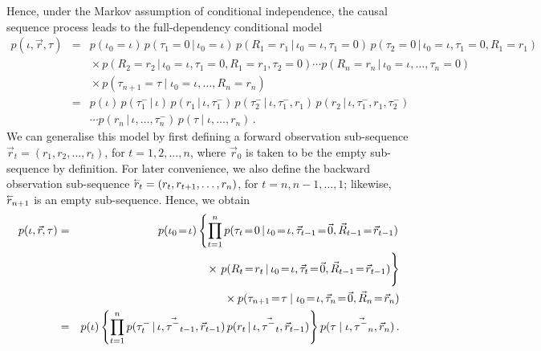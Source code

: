 \documentclass[a4paper]{article}
\newcommand{\rvec}[1]{\accentset{\leftarrow}{#1}}
\begin{document}
Hence, under the Markov assumption of conditional independence,
the causal sequence process leads to the full-dependency conditional model
\begin{eqnarray}
p({\iota},\vec{r},{\tau}) & = &
p(\iota_0\!=\!{\iota})
\,p(\tau_1\!=\!0\,|\,\iota_0\!=\!{\iota})
\,p(R_1\!=\!r_1\,|\,\iota_0\!=\!{\iota},\tau_1\!=\!0)
\,p(\tau_2\!=\!0\,|\,\iota_0\!=\!{\iota},\tau_1\!=\!0,R_1\!=\!r_1)
\nonumber\\&&
{}\times p(R_2\!=\!r_2\,|\,\iota_0\!=\!{\iota},\tau_1\!=\!0,R_1\!=\!r_1,\tau_2\!=\!0)
\cdots
p(R_n\!=\!r_n\,|\,\iota_0\!=\!{\iota},\ldots,\tau_{n}\!=\!0)
\nonumber\\&&
{}\times p(\tau_{n+1}\!=\!{\tau}\:|\;\iota_0\!=\!{\iota},\ldots,R_n\!=\!r_n)
\nonumber\\
& = &
p({\iota})
\,p(\tau^-_1\,|\,{\iota})
\,p(r_1\,|\,{\iota},\tau^-_1)
\,p(\tau^-_2\,|\,{\iota},\tau^-_1,r_1)
\, p(r_2\,|\,{\iota},\tau^-_1,r_1,\tau^-_2)
\nonumber\\
&&
\cdots
p(r_n\,|\,{\iota},\ldots,\tau^-_{n})
\, p({\tau}\:|\;{\iota},\ldots,r_n)
\,.
\label{eq:temporal-model-full}
\end{eqnarray}
We can generalise this model by first defining a forward observation sub-sequence $\vec{r}_t=(r_1,r_2,\ldots,r_t)$,
for $t=1,2,\ldots,n$, where $\vec{r}_0$ is taken to be the empty sub-sequence by definition.
 For later convenience, we also define the backward observation sub-sequence $\rvec{r}_t=(r_t,r_{t+1},\ldots,r_n)$,
for $t=n,n-1,\ldots,1$; likewise, $\rvec{r}_{n+1}$ is an empty sub-sequence.
Hence, we obtain
\begin{eqnarray}
p({\iota},\vec{r},{\tau}) & = &
p(\iota_0\!=\!{\iota})
\left\{\prod_{t=1}^{n}p(\tau_t\!=\!0\,|\,\iota_0\!=\!{\iota},\vec{\tau}_{t-1}\!=\!\vec{0},
\vec{R}_{t-1}\!=\!\vec{r}_{t-1})\right.
\nonumber\\&&
\hspace*{20mm}{}\times \left.\rule{0pt}{6mm}
p(R_t\!=\!r_t\,|\,\iota_0\!=\!{\iota},\vec{\tau}_t\!=\!\vec{0},\vec{R}_{t-1}\!=\!\vec{r}_{t-1})\right\}
\nonumber\\&&
{}\times p(\tau_{n+1}\!=\!{\tau}\:|\;\iota_0\!=\!{\iota},\vec{\tau}_n\!=\!\vec{0},\vec{R}_n\!=\!\vec{r}_n)
\nonumber\\
& = &
p({\iota})
\left\{\prod_{t=1}^{n}p(\tau^-_t\,|\,{\iota},\vec{\tau^-}_{t-1},\vec{r}_{t-1})
\,p(r_t\,|\,{\iota},\vec{\tau^-}_t,\vec{r}_{t-1})\right\}
 p({\tau}\:|\;{\iota},\vec{\tau^-}_n,\vec{r}_n)
\,.
\label{eq:temporal-model}
\end{eqnarray}
\end{document}
